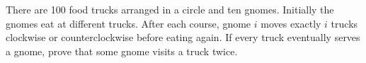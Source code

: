 There are 100 food trucks arranged in a circle and ten gnomes. Initially the gnomes eat at different trucks. After each course, gnome $i$ moves exactly $i$ trucks clockwise or counterclockwise before eating again. If every truck eventually serves a gnome, prove that some gnome visits a truck twice.
